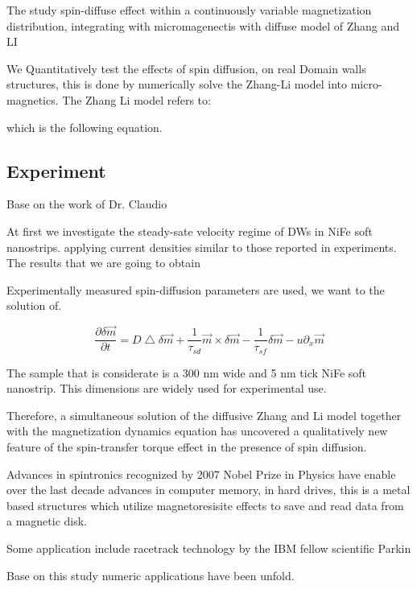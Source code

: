 The study spin-diffuse effect within a continuously variable magnetization distribution, integrating with micromagenectis with diffuse model of Zhang and LI \cite{claudio}

We Quantitatively test the effects of spin diffusion, on real Domain walls structures, this is done by numerically solve the Zhang-Li model \cite{zhang} into micro-magnetics.
The Zhang Li model refers to:

which is the following equation.

\subsection{Experiment}

Base on the work of Dr. Claudio \cite{claudio}

At first we investigate the steady-sate velocity regime of DWs in NiFe soft nanostrips. applying current densities similar to those reported in experiments. The results that we are going to obtain

Experimentally measured spin-diffusion parameters are used, we want to the solution of.

\begin{equation}
 \frac{\partial \delta \vec{m} }{\partial t} =  D\bigtriangleup \delta \vec{m} + \frac{1}{\tau_{sd}} \vec{m} \times \delta  \vec{m} - \frac{1}{\tau_{sf}}\delta \vec{m} - u \partial_{x}  \vec{m}
\end{equation}

The sample that is considerate is a 300 nm wide and 5 nm tick NiFe soft nanostrip. This dimensions are widely used for experimental use.

Therefore, a simultaneous solution of the diffusive Zhang and Li model together with the magnetization dynamics equation has uncovered a qualitatively new feature of the spin-transfer torque effect in the presence of spin diffusion.


Advances in spintronics recognized by 2007 Nobel Prize in Physics have enable over the last decade advances in computer memory, in hard drives, this is a metal based structures which utilize magnetoresisite effects to save and read data from a magnetic disk. \cite{handbookspin}

Some application include racetrack technology by the IBM fellow scientific Parkin \cite{racetrack}

Base on this study numeric applications have been unfold.


